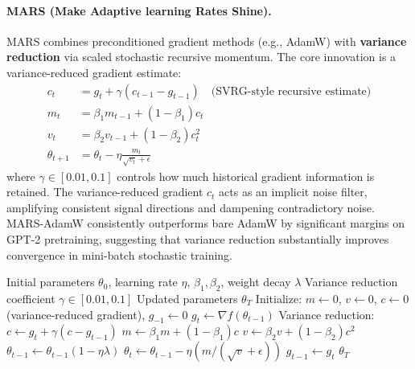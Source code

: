 \paragraph{MARS (Make Adaptive learning Rates Shine).}
MARS combines preconditioned gradient methods (e.g., AdamW) with \textbf{variance reduction} via scaled stochastic recursive momentum. The core innovation is a variance-reduced gradient estimate:
\begin{align}
c_t &= g_t + \gamma(c_{t-1} - g_{t-1}) \quad\text{(SVRG-style recursive estimate)} \\
m_t &= \beta_1 m_{t-1} + (1-\beta_1)c_t \\
v_t &= \beta_2 v_{t-1} + (1-\beta_2)c_t^2 \\
\theta_{t+1} &= \theta_t - \eta\frac{m_t}{\sqrt{v_t}+\epsilon}
\end{align}
where $\gamma \in [0.01, 0.1]$ controls how much historical gradient information is retained. The variance-reduced gradient $c_t$ acts as an implicit noise filter, amplifying consistent signal directions and dampening contradictory noise. MARS-AdamW consistently outperforms bare AdamW by significant margins on GPT-2 pretraining, suggesting that variance reduction substantially improves convergence in mini-batch stochastic training.

\begin{algorithm}[H]
\caption{MARS (Make Adaptive learning Rates Shine)}
\label{alg:mars}
\begin{algorithmic}[1]
\Require Initial parameters $\theta_0$, learning rate $\eta$, $\beta_1, \beta_2$, weight decay $\lambda$
\Require Variance reduction coefficient $\gamma \in [0.01, 0.1]$
\Ensure Updated parameters $\theta_T$
\State Initialize: $m \gets 0$, $v \gets 0$, $c \gets 0$ (variance-reduced gradient), $g_{-1} \gets 0$
    \State $g_t \gets \nabla f(\theta_{t-1})$
    \State Variance reduction: $c \gets g_t + \gamma(c - g_{t-1})$
    \State $m \gets \beta_1 m + (1-\beta_1) c$
    \State $v \gets \beta_2 v + (1-\beta_2) c^2$
        \State $\theta_{t-1} \gets \theta_{t-1}(1 - \eta\lambda)$
    \EndIf
    \State $\theta_t \gets \theta_{t-1} - \eta (m / (\sqrt{v} + \epsilon))$
    \State $g_{t-1} \gets g_t$
\EndFor
\Return $\theta_T$
\end{algorithmic}
\end{algorithm}

